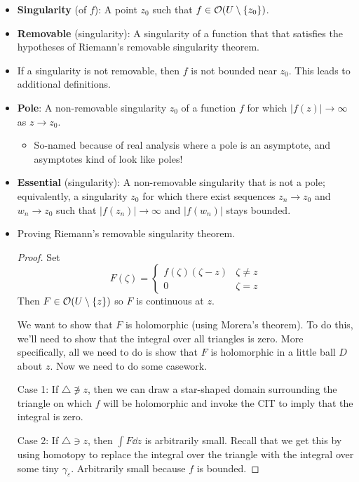 \documentclass[../notes.tex]{subfiles}
\begin{document}
\begin{itemize}
    \item \textbf{Singularity} (of $f$): A point $z_0$ such that $f\in\mathcal{O}(U\setminus\{z_0\})$.
    \item \textbf{Removable} (singularity): A singularity of a function that that satisfies the hypotheses of Riemann's removable singularity theorem.
    \item If a singularity is not removable, then $f$ is not bounded near $z_0$. This leads to additional definitions.
    \item \textbf{Pole}: A non-removable singularity $z_0$ of a function $f$ for which $|f(z)|\to\infty$ as $z\to z_0$.
    \begin{itemize}
        \item So-named because of real analysis where a pole is an asymptote, and asymptotes kind of look like poles!
    \end{itemize}
    \item \textbf{Essential} (singularity): A non-removable singularity that is not a pole; equivalently, a singularity $z_0$ for which there exist sequences $z_n\to z_0$ and $w_n\to z_0$ such that $|f(z_n)|\to\infty$ and $|f(w_n)|$ stays bounded.
    \item Proving Riemann's removable singularity theorem.
    \begin{proof}
        Set
        \begin{equation*}
            F(\zeta) =
            \begin{cases}
                f(\zeta)(\zeta-z) & \zeta\neq z\\
                0 & \zeta=z
            \end{cases}
        \end{equation*}
        Then $F\in\mathcal{O}(U\setminus\{z\})$ so $F$ is continuous at $z$.\par
        We want to show that $F$ is holomorphic (using Morera's theorem). To do this, we'll need to show that the integral over all triangles is zero. More specifically, all we need to do is show that $F$ is holomorphic in a little ball $D$ about $z$. Now we need to do some casework.\par
        Case 1: If $\triangle\not\ni z$, then we can draw a star-shaped domain surrounding the triangle on which $f$ will be holomorphic and invoke the CIT to imply that the integral is zero.\par
        Case 2: If $\triangle\ni z$, then $\int F\dd{z}$ is arbitrarily small. Recall that we get this by using homotopy to replace the integral over the triangle with the integral over some tiny $\gamma_\varepsilon$. Arbitrarily small because $f$ is bounded.\par

\end{proof}
\end{itemize}
\end{document}

